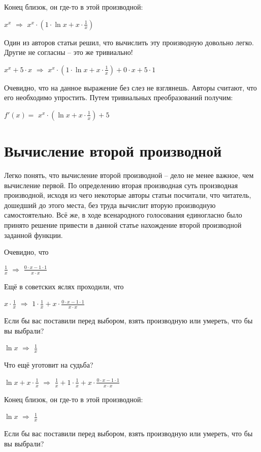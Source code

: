\documentclass{article}
\begin{document}
Конец близок, он где-то в этой производной:

$x ^ {x}$ $\Rightarrow$ $x ^ {x} \cdot (1 \cdot  \ln x + x \cdot \frac{1}{x})$

Один из авторов статьи решил, что вычислить эту производную довольно легко. Другие не согласны -- это же тривиально!

$x ^ {x} + 5 \cdot x$ $\Rightarrow$ $x ^ {x} \cdot (1 \cdot  \ln x + x \cdot \frac{1}{x}) + 0 \cdot x + 5 \cdot 1$

Очевидно, что на данное выражение без слез не взглянешь. Авторы считают, что его необходимо упростить. Путем тривиальных преобразований получим:

$f'(x) = $ $x ^ {x} \cdot ( \ln x + x \cdot \frac{1}{x}) + 5$\section{Вычисление второй производной}

Легко понять, что вычисление второй производной -- дело не менее важное, чем вычисление первой. По определению вторая производная суть производная производной, исходя из чего некоторые авторы статьи посчитали, что читатель, дошедший до этого места, без труда вычислит вторую производную самостоятельно. Всё же, в ходе всенародного голосования единогласно было принято решение привести в данной статье нахождение второй производной заданной функции.

Очевидно, что

$\frac{1}{x}$ $\Rightarrow$ $\frac{0 \cdot x - 1 \cdot 1}{x \cdot x}$

Ещё в советских яслях проходили, что

$x \cdot \frac{1}{x}$ $\Rightarrow$ $1 \cdot \frac{1}{x} + x \cdot \frac{0 \cdot x - 1 \cdot 1}{x \cdot x}$

Если бы вас поставили перед выбором, взять производную или умереть, что бы вы выбрали?

$ \ln x$ $\Rightarrow$ $\frac{1}{x}$

Что ещё уготовит на судьба?

$ \ln x + x \cdot \frac{1}{x}$ $\Rightarrow$ $\frac{1}{x} + 1 \cdot \frac{1}{x} + x \cdot \frac{0 \cdot x - 1 \cdot 1}{x \cdot x}$

Конец близок, он где-то в этой производной:

$ \ln x$ $\Rightarrow$ $\frac{1}{x}$

Если бы вас поставили перед выбором, взять производную или умереть, что бы вы выбрали?
\end{document}
